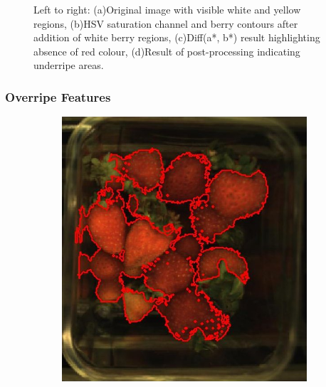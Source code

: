 \documentclass[fleqn,twoside]{article}
\begin{document}
\begin{figure}[ht]
	\caption{Left to right: (a)Original image with visible white and yellow regions, (b)HSV saturation channel and berry contours after addition of white berry regions, (c)Diff(a*, b*) result highlighting absence of red colour, (d)Result of post-processing indicating underripe areas.}
	\label{fig:underripe_process}
\end{figure}


\subsubsection{Overripe Features}

\begin{figure}[ht]
	\centering
	\begin{subfigure}{.30\textwidth}
		\centering
		\includegraphics[width=.9\linewidth]{over_berries.jpg}
		\caption{}
		\label{fig:over_berries}
	\end{subfigure}%
	\begin{subfigure}{.30\textwidth}
		\centering

\end{subfigure}
\end{figure}
\end{document}
